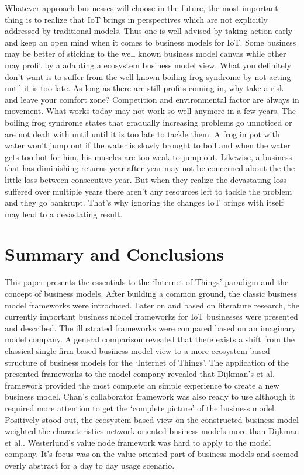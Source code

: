 		Whatever approach businesses will choose in the future, the most important thing is to realize that IoT brings in perspectives which are not explicitly addressed by traditional models. Thus one is well advised by taking action early and keep an open mind when it comes to business models for IoT. Some business may be better of sticking to the well known business model canvas while other may profit by a adapting a ecosystem business model view. What you definitely don't want is to suffer from the well known boiling frog syndrome by not acting until it is too late. As long as there are still profits coming in, why take a risk and leave your comfort zone? Competition and environmental factor are always in movement. What works today may not work so well anymore in a few years. The boiling frog syndrome states that gradually increasing problems go unnoticed or are not dealt with until until it is too late to tackle them. A frog in pot with water won't jump out if the water is slowly brought to boil and when the water gets too hot for him, his muscles are too weak to jump out. Likewise, a business that has diminishing returns year after year may not be concerned about the the little loss between consecutive year. But when they realize the devastating loss suffered over multiple years there aren't any resources left to tackle the problem and they go bankrupt. That's why ignoring the changes IoT brings with itself may lead to a devastating result.

\section{Summary and Conclusions}
\label{sec:summary}
	

	This paper presents the essentials to the `Internet of Things' paradigm and the concept of business models. After building a common ground, the classic business model frameworks were introduced. Later on and based on literature research, the currently important business model frameworks for IoT businesses were presented and described. The illustrated frameworks were compared based on an imaginary model company. A general comparison revealed that there exists a shift from the classical single firm based business model view to a more ecosystem based structure of business models for the `Internet of Things'. The application of the presented frameworks to the model company revealed that Dijkman's et al. framework provided the most complete an simple experience to create a new business model. Chan's collaborator framework was also ready to use although it required more attention to get the `complete picture' of the business model. Positively stood out, the ecosystem based view on the constructed business model weighted the characteristics network oriented business models more than Dijkman et al.. Westerlund's value node framework was hard to apply to the model company. It's focus was on the value oriented part of business models and seemed overly abstract for a day to day usage scenario. 

